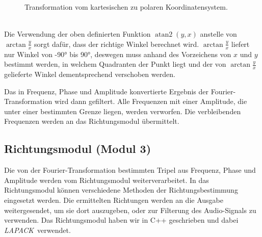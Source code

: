 \begin{minipage}{0.39\textwidth}
    \begin{figure}[H]
        \centering
        \scalebox{.6}{}
        \caption{Transformation vom kartesischen zu polaren Koordinatensystem\label{fig:polarconvert}.}
    \end{figure}
\vspace{10pt}
\end{minipage}
\\
Die Verwendung der oben definierten Funktion $\operatorname{atan2}(y,x)$ anstelle von $\arctan\frac{y}{x}$ sorgt dafür, dass der richtige Winkel berechnet wird. $\arctan\frac{y}{x}$ liefert nur Winkel von \ang{-90} bis \ang{90}, deswegen muss anhand des Vorzeichens von $x$ und $y$ bestimmt werden, in welchem Quadranten der Punkt liegt und der von $\arctan\frac{y}{x}$ gelieferte Winkel dementsprechend verschoben werden.

Das in Frequenz, Phase und Amplitude konvertierte Ergebnis der Fourier-Transformation wird dann gefiltert. Alle Frequenzen mit einer Amplitude, die unter einer bestimmten Grenze liegen, werden verworfen. Die verbleibenden Frequenzen werden an das Richtungsmodul übermittelt.

\subsection{Richtungsmodul (Modul 3)}
Die von der Fourier-Transformation bestimmten Tripel aus Frequenz, Phase und Amplitude werden vom Richtungsmodul weiterverarbeitet. In das Richtungsmodul können verschiedene Methoden der Richtungsbestimmung eingesetzt werden. Die ermittelten Richtungen werden an die Ausgabe weitergesendet, um sie dort auszugeben, oder zur Filterung des Audio-Signals zu verwenden.
Das Richtungsmodul haben wir in C++ geschrieben und dabei \textit{LAPACK}~\cite{Anderson:1990:LPL:110382.110385}verwendet.
\pagebreak
